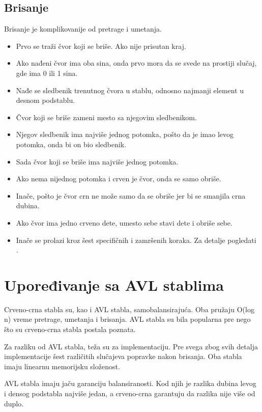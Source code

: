 \documentclass[a4paper]{article}
\begin{document}
\subsection{Brisanje}
Brisanje je komplikovanije od pretrage i umetanja.

\begin{itemize}
    \item Prvo se traži čvor koji se briše. Ako nije prisutan kraj.
    \item Ako nađeni čvor ima oba sina, onda prvo mora da se svede na prostiji slučaj, gde ima 0 ili 1 sina.
    \item Nađe se sledbenik trenutnog čvora u stablu, odnosno najmanji element u desnom podstablu.
    \item Čvor koji se briše zameni mesto sa njegovim sledbenikom.
    \item Njegov sledbenik ima najviše jednog potomka, pošto da je imao levog potomka, onda bi on bio sledbenik.
    \item Sada čvor koji se briše ima najviše jednog potomka. 
    \item Ako nema nijednog potomka i crven je čvor, onda se samo obriše.
    \item Inače, pošto je čvor crn ne može samo da se obriše jer bi se smanjila crna dubina.
    \item Ako čvor ima jedno crveno dete, umesto sebe stavi dete i obriše sebe.
    \item Inače se prolazi kroz šest specifičnih i zamršenih koraka. Za detalje pogledati \cite{cases}.
\end{itemize}


\section{Upoređivanje sa AVL stablima}
    Crveno-crna stabla su, kao i AVL stabla, samobalansirajuća. Oba pružaju O(log n) vreme pretrage, umetanja i brisanja.
    AVL stabla su bila popularna pre nego što su crveno-crna stabla postala poznata.

    Za razliku od AVL stabla, teža su za implementaciju. Pre svega zbog svih detalja implementacije šest različitih slučajeva 
    popravke nakon brisanja.
    Oba stabla imaju linearnu memorijsku složenost.

    AVL stabla imaju jaču garanciju balansiranosti. Kod njih je razlika dubina levog i densog podstabla najviše jedan, a crveno-crna garantuju da razlika nije više od duplo.
\end{document}
